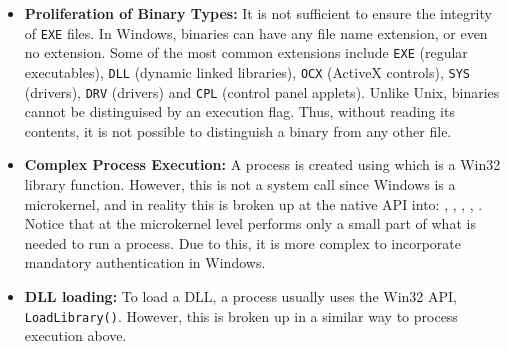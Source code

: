 \begin{itemize}
\item {\bf Proliferation of Binary Types:}
It is not sufficient to ensure the integrity of {\tt EXE} files.
In Windows, binaries can have any file name extension, or even no extension.
Some of the most common extensions include {\tt EXE} (regular
executables), {\tt DLL} (dynamic linked libraries), {\tt OCX} 
(ActiveX controls), {\tt SYS} (drivers), {\tt DRV} (drivers)
and {\tt CPL} (control panel applets).
Unlike Unix, binaries cannot be distinguised by an execution flag.
Thus, without reading its contents,
it is not possible to distinguish a binary from any other file.

\item {\bf Complex Process Execution:}
A process is created using  which is a Win32 library
function. However, this is not a system call since Windows is a microkernel,
and in reality this is broken up at the native API into:
, , ,
, .
Notice that  at the microkernel level
performs only a small part of what is needed to run a process.
Due to this, it is more complex to incorporate mandatory authentication in Windows.

\item {\bf DLL loading:}
To load a DLL, a process usually uses the Win32 API, {\tt LoadLibrary()}.
However, this is broken up in a similar way to process execution above.



\end{itemize}
